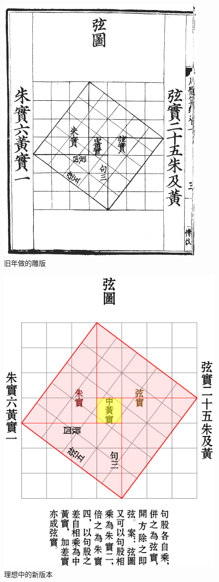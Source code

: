 \begin{figure}
  \centering
  \includegraphics[height=\textheight-2\baselineskip]{xiantu-ancient.pdf}
  \caption{旧年做的雕版}
  \label{fig:xiantuancient}
\end{figure}
\begin{figure}
  \centering
  \includegraphics{xiantu.pdf}
  \caption{理想中的新版本}
  \label{fig:xiantu}
\end{figure}

